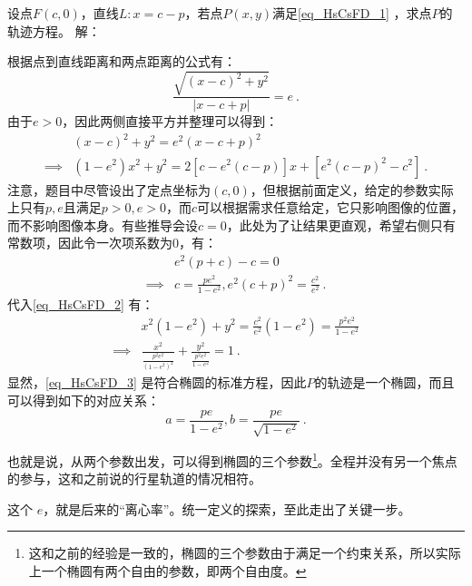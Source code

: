 \begin{example}{设点$F(c,0)$，直线$L:x=c-p$，若点$P(x,y)$满足\autoref{eq_HsCsFD_1} ，求点$P$的轨迹方程。}\label{ex_HsCsFD_1}
解：

根据点到直线距离和两点距离的公式有：
\begin{equation}
\frac{\sqrt{(x - c)^2 + y^2}}{|x - c + p|} = e~.
\end{equation}
由于$e>0$，因此两侧直接平方并整理可以得到：
\begin{equation}\label{eq_HsCsFD_2}
\begin{split}
&(x - c)^2 + y^2 = e^2(x - c + p)^2\\\implies &(1 - e^2)x^2+ y^2=2[c-e^2(c-p)]x + [e^2(c - p)^2 - c^2]~.
\end{split}
\end{equation}
注意，题目中尽管设出了定点坐标为$(c,0)$，但根据前面定义，给定的参数实际上只有$p,e$且满足$p>0,e>0$，而$c$可以根据需求任意给定，它只影响图像的位置，而不影响图像本身。有些推导会设$c=0$，此处为了让结果更直观，希望右侧只有常数项，因此令一次项系数为$0$，有：
\begin{equation}
\begin{split}
&e^2(p+c)-c=0\\\implies &c=\frac{pe^2}{1-e^2},e^2(c+p)^2=\frac{c^2}{e^2}~.
\end{split}
\end{equation}
代入\autoref{eq_HsCsFD_2} 有：
\begin{equation}\label{eq_HsCsFD_3}
\begin{split}
&x^2(1 - e^2)+ y^2= \frac{c^2}{e^2}(1-e^2)=\frac{p^2 e^2}{1-e^2}\\
\implies&\frac{x^2}{\displaystyle\frac{p^2 e^2}{(1-e^2)^2}}+ \frac{y^2}{\displaystyle\frac{p^2 e^2}{1-e^2}}= 1~.
\end{split}
\end{equation}
显然，\autoref{eq_HsCsFD_3} 是符合椭圆的标准方程，因此$P$的轨迹是一个椭圆，而且可以得到如下的对应关系：
\begin{equation}
a=\frac{p e}{1-e^2},b=\frac{p e}{\sqrt{1-e^2}}~.
\end{equation}
\end{example}
也就是说，从两个参数出发，可以得到椭圆的三个参数\footnote{这和之前的经验是一致的，椭圆的三个参数由于满足一个约束关系，所以实际上一个椭圆有两个自由的参数，即两个自由度。}。全程并没有另一个焦点的参与，这和之前说的行星轨道的情况相符。

这个 $e$，就是后来的“离心率”。统一定义的探索，至此走出了关键一步。


